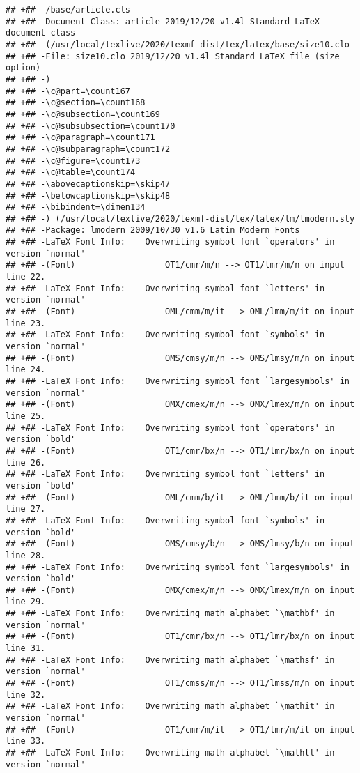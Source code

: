 \documentclass[ignorenonframetext,]{beamer}
\begin{document}
\begin{verbatim}
## +## -/base/article.cls
## +## -Document Class: article 2019/12/20 v1.4l Standard LaTeX document class
## +## -(/usr/local/texlive/2020/texmf-dist/tex/latex/base/size10.clo
## +## -File: size10.clo 2019/12/20 v1.4l Standard LaTeX file (size option)
## +## -)
## +## -\c@part=\count167
## +## -\c@section=\count168
## +## -\c@subsection=\count169
## +## -\c@subsubsection=\count170
## +## -\c@paragraph=\count171
## +## -\c@subparagraph=\count172
## +## -\c@figure=\count173
## +## -\c@table=\count174
## +## -\abovecaptionskip=\skip47
## +## -\belowcaptionskip=\skip48
## +## -\bibindent=\dimen134
## +## -) (/usr/local/texlive/2020/texmf-dist/tex/latex/lm/lmodern.sty
## +## -Package: lmodern 2009/10/30 v1.6 Latin Modern Fonts
## +## -LaTeX Font Info:    Overwriting symbol font `operators' in version `normal'
## +## -(Font)                  OT1/cmr/m/n --> OT1/lmr/m/n on input line 22.
## +## -LaTeX Font Info:    Overwriting symbol font `letters' in version `normal'
## +## -(Font)                  OML/cmm/m/it --> OML/lmm/m/it on input line 23.
## +## -LaTeX Font Info:    Overwriting symbol font `symbols' in version `normal'
## +## -(Font)                  OMS/cmsy/m/n --> OMS/lmsy/m/n on input line 24.
## +## -LaTeX Font Info:    Overwriting symbol font `largesymbols' in version `normal'
## +## -(Font)                  OMX/cmex/m/n --> OMX/lmex/m/n on input line 25.
## +## -LaTeX Font Info:    Overwriting symbol font `operators' in version `bold'
## +## -(Font)                  OT1/cmr/bx/n --> OT1/lmr/bx/n on input line 26.
## +## -LaTeX Font Info:    Overwriting symbol font `letters' in version `bold'
## +## -(Font)                  OML/cmm/b/it --> OML/lmm/b/it on input line 27.
## +## -LaTeX Font Info:    Overwriting symbol font `symbols' in version `bold'
## +## -(Font)                  OMS/cmsy/b/n --> OMS/lmsy/b/n on input line 28.
## +## -LaTeX Font Info:    Overwriting symbol font `largesymbols' in version `bold'
## +## -(Font)                  OMX/cmex/m/n --> OMX/lmex/m/n on input line 29.
## +## -LaTeX Font Info:    Overwriting math alphabet `\mathbf' in version `normal'
## +## -(Font)                  OT1/cmr/bx/n --> OT1/lmr/bx/n on input line 31.
## +## -LaTeX Font Info:    Overwriting math alphabet `\mathsf' in version `normal'
## +## -(Font)                  OT1/cmss/m/n --> OT1/lmss/m/n on input line 32.
## +## -LaTeX Font Info:    Overwriting math alphabet `\mathit' in version `normal'
## +## -(Font)                  OT1/cmr/m/it --> OT1/lmr/m/it on input line 33.
## +## -LaTeX Font Info:    Overwriting math alphabet `\mathtt' in version `normal'

\end{verbatim}
\end{document}

